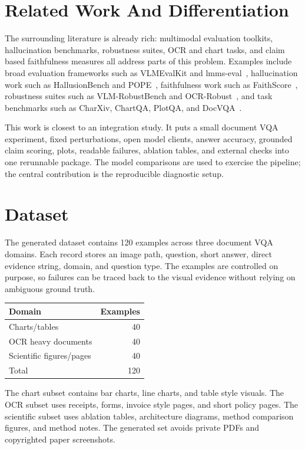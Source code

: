 \documentclass{article}
\begin{document}
\section{Related Work And Differentiation}

The surrounding literature is already rich: multimodal evaluation toolkits, hallucination benchmarks, robustness suites, OCR and chart tasks, and claim based faithfulness measures all address parts of this problem. Examples include broad evaluation frameworks such as VLMEvalKit and lmms-eval~\cite{vlmevalkit,lmmseval}, hallucination work such as HallusionBench and POPE~\cite{hallusionbench,pope}, faithfulness work such as FaithScore~\cite{faithscore}, robustness suites such as VLM-RobustBench and OCR-Robust~\cite{vlmrobustbench,ocrrobust}, and task benchmarks such as CharXiv, ChartQA, PlotQA, and DocVQA~\cite{charxiv,chartqa,plotqa,docvqa}.

This work is closest to an integration study. It puts a small document VQA experiment, fixed perturbations, open model clients, answer accuracy, grounded claim scoring, plots, readable failures, ablation tables, and external checks into one rerunnable package. The model comparisons are used to exercise the pipeline; the central contribution is the reproducible diagnostic setup.

\section{Dataset}

The generated dataset contains 120 examples across three document VQA domains. Each record stores an image path, question, short answer, direct evidence string, domain, and question type. The examples are controlled on purpose, so failures can be traced back to the visual evidence without relying on ambiguous ground truth.

\begin{center}
\begin{tabular}{lr}
\hline
\textbf{Domain} & \textbf{Examples} \\
\hline
Charts/tables & 40 \\
OCR heavy documents & 40 \\
Scientific figures/pages & 40 \\
\hline
Total & 120 \\
\hline
\end{tabular}
\end{center}

The chart subset contains bar charts, line charts, and table style visuals. The OCR subset uses receipts, forms, invoice style pages, and short policy pages. The scientific subset uses ablation tables, architecture diagrams, method comparison figures, and method notes. The generated set avoids private PDFs and copyrighted paper screenshots.
\end{document}
